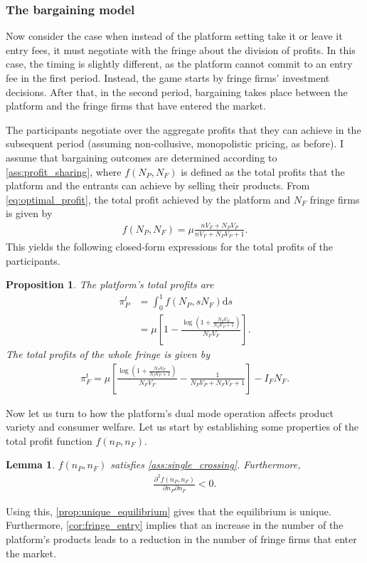 \documentclass[a4paper]{article}
\newtheorem{proposition}{Proposition}
\newtheorem{lemma}{Lemma}
\newcommand{\ds}{\mathrm{d}s}
\begin{document}
\subsubsection{The bargaining model}

Now consider the case when instead of the platform setting take it or leave it entry fees, it must negotiate with the fringe about the division of profits.
In this case, the timing is slightly different, as the platform cannot commit to an entry fee in the first period.
Instead, the game starts by fringe firms' investment decisions.
After that, in the second period, bargaining takes place between the platform and the fringe firms that have entered the market.

The participants negotiate over the aggregate profits that they can achieve in the subsequent period (assuming non-collusive, monopolistic pricing, as before).
I assume that bargaining outcomes are determined according to \cref{ass:profit_sharing}, where $f(N_P, N_F)$ is defined as the total profits that the platform and the entrants can achieve by selling their products.
From \cref{eq:optimal_profit}, the total profit achieved by the platform and $N_F$ fringe firms is given by
\begin{align*}
    f(N_P, N_F) = \mu \frac{n V_F + N_P V_P}{n V_F + N_P V_P + 1}.
\end{align*}
This yields the following closed-form expressions for the total profits of the participants.
\begin{proposition}
    \label{prop:platform_profits_bargaining}
    The platform's total profits are
    \begin{align*}
        \pi^t_P &=\int_0^1 f(N_P, sN_F) \ds \\
                &= \mu \left[ 1 - \frac{\log \left(1 + \frac{N_F V_F}{N_P V_P + 1} \right)}{N_F V_F} \right].
    \end{align*}
    The total profits of the whole fringe is given by
    \begin{align*}
        \pi^t_F = \mu \left[ \frac{\log \left( 1 + \frac{N_F V_F}{N_P V_P + 1} \right)}{N_F V_F} - \frac{1}{N_P V_P + N_F V_F + 1} \right] - I_F N_F.
    \end{align*}
\end{proposition}

Now let us turn to how the platform's dual mode operation affects product variety and consumer welfare.
Let us start by establishing some properties of the total profit function $f(n_P, n_F)$.
\begin{lemma}
    \label{lem:profit_assumptions}
    $f(n_P, n_F)$ satisfies \cref{ass:single_crossing}.
    Furthermore,
    \begin{align*}
        \frac{\partial^2 f(n_P, n_F)}{\partial n_P \partial n_F} < 0.
    \end{align*}
\end{lemma}
Using this, \cref{prop:unique_equilibrium} gives that the equilibrium is unique.
Furthermore, \cref{cor:fringe_entry} implies that an increase in the number of the platform's products leads to a reduction in the number of fringe firms that enter the market.
\end{document}
